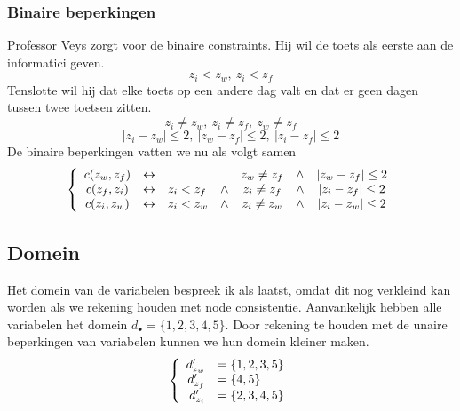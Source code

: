 \documentclass[alternative-exam.tex]{subfiles}
\begin{document}
\subsubsection{Binaire beperkingen}
Professor Veys zorgt voor de binaire constraints. Hij wil de toets als eerste aan de informatici geven.
\[
z_i < z_w,\ z_i < z_f
\]
Tenslotte wil hij dat elke toets op een andere dag valt en dat er geen dagen tussen twee toetsen zitten.
\[
z_i \neq z_w,\ z_i \neq z_f,\ z_w \neq z_f
\]
\[
|z_i - z_w| \le 2,\ |z_w - z_f| \le 2,\ |z_i - z_f| \le 2
\]
De binaire beperkingen vatten we nu als volgt samen
\[
\left\lbrace
\begin{array}{c l l c c c c}
c(z_w, z_f) & \leftrightarrow && & z_w \neq z_f &\wedge& |z_w - z_f| \le 2\\
c(z_f, z_i) & \leftrightarrow & z_i < z_f &\wedge& z_i \neq z_f &\wedge& |z_i - z_f| \le 2\\
c(z_i, z_w) & \leftrightarrow & z_i < z_w &\wedge& z_i \neq z_w &\wedge& |z_i - z_w| \le 2\\
\end{array}
\right.
\]

\subsection{Domein}
Het domein van de variabelen bespreek ik als laatst, omdat dit nog verkleind kan worden als we rekening houden met node consistentie.
Aanvankelijk hebben alle variabelen het domein $d_\bullet = \{1,2,3,4,5\}$. Door rekening te houden met de unaire beperkingen van variabelen kunnen we hun domein kleiner maken.
\[
\left\lbrace
\begin{array}{r l}
d_{z_w}' &= \{1,2,3,5\}\\
d_{z_f}' &= \{4,5\}\\
d_{z_i}' &= \{2,3,4,5\}\\
\end{array}
\right.
\]
\end{document}
